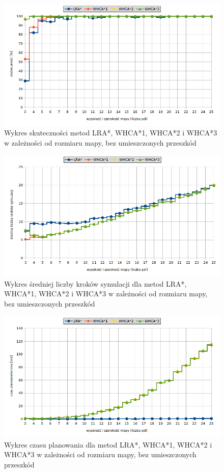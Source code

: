 \begin{figure}
	\centering
	\includegraphics[width=0.8\columnwidth]{img/plots/test-steps-empty-mapsize-eff}
	\caption{Wykres skuteczności metod LRA*, WHCA*1, WHCA*2 i WHCA*3 w zależności od rozmiaru mapy, bez umieszczonych przeszkód}
	\label{fig:test-steps-empty-mapsize-eff}
\end{figure}
\begin{figure}
	\centering
	\includegraphics[width=0.8\columnwidth]{img/plots/test-steps-empty-mapsize-steps}
	\caption{Wykres średniej liczby kroków symulacji dla metod LRA*, WHCA*1, WHCA*2 i WHCA*3 w zależności od rozmiaru mapy, bez umieszczonych przeszkód}
	\label{fig:test-steps-empty-mapsize-steps}
\end{figure}
\begin{figure}
	\centering
	\includegraphics[width=0.8\columnwidth]{img/plots/test-steps-empty-mapsize-calctime}
	\caption{Wykres czasu planowania dla metod LRA*, WHCA*1, WHCA*2 i WHCA*3 w zależności od rozmiaru mapy, bez umieszczonych przeszkód}
	\label{fig:test-steps-empty-mapsize-calctime}
\end{figure}


